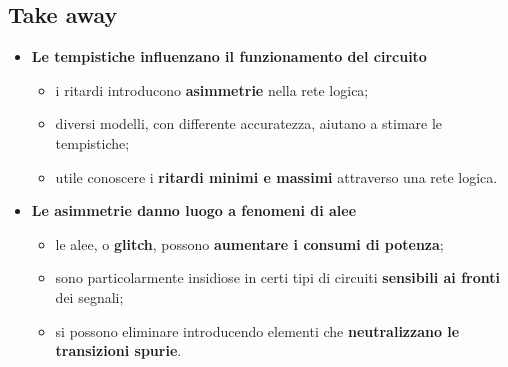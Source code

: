 \documentclass[12pt, a4paper]{article}
\begin{document}
\subsection{Take away}

\begin{itemize}
    \item \textbf{Le tempistiche influenzano il funzionamento del circuito}
    \begin{itemize}
        \item i ritardi introducono \textbf{asimmetrie} nella rete logica;
        \item diversi modelli, con differente accuratezza, aiutano a stimare le tempistiche;
        \item utile conoscere i \textbf{ritardi minimi e massimi} attraverso una rete logica.
    \end{itemize}
    \item \textbf{Le asimmetrie danno luogo a fenomeni di alee}
    \begin{itemize}
        \item le alee, o \textbf{glitch}, possono \textbf{aumentare i consumi di potenza};
        \item sono particolarmente insidiose in certi tipi di circuiti \textbf{sensibili ai fronti} dei segnali;
        \item si possono eliminare introducendo elementi che \textbf{neutralizzano le transizioni spurie}.
    \end{itemize}
\end{itemize}
\end{document}
